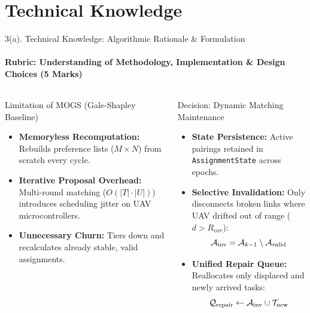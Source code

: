 \documentclass[aspectratio=169, 11pt]{beamer}
\begin{document}
\section{Technical Knowledge}
\begin{frame}{3(a). Technical Knowledge: Algorithmic Rationale \& Formulation}
    \framesubtitle{Rubric: Understanding of Methodology, Implementation \& Design Choices (5 Marks)}
    \begin{columns}[T]
        \begin{block}{Limitation of MOGS (Gale-Shapley Baseline)}
            \begin{itemize}\setlength{\itemsep}{4pt}\footnotesize
                \item \textbf{Memoryless Recomputation:} Rebuilds preference lists ($M \times N$) from scratch every cycle.
                \item \textbf{Iterative Proposal Overhead:} Multi-round matching ($O(|T| \cdot |U|)$) introduces scheduling jitter on UAV microcontrollers.
                \item \textbf{Unnecessary Churn:} Tiers down and recalculates already stable, valid assignments.
            \end{itemize}
        \end{block}

        \begin{block}{Decision: Dynamic Matching Maintenance}
            \begin{itemize}\setlength{\itemsep}{4pt}\footnotesize
                \item \textbf{State Persistence:} Active pairings retained in \texttt{AssignmentState} across epochs.
                \item \textbf{Selective Invalidation:} Only disconnects broken links where UAV drifted out of range ($d > R_{\text{cov}}$):
                \vspace{-2mm}
                \begin{equation*}
                    \small
                    \mathcal{A}_{\text{inv}} = \mathcal{A}_{k-1} \setminus \mathcal{A}_{\text{valid}}
                \end{equation*}
                \vspace{-3mm}
                \item \textbf{Unified Repair Queue:} Reallocates only displaced and newly arrived tasks:
                \vspace{-2mm}
                \begin{equation*}
                    \small
                    \mathcal{Q}_{\text{repair}} \leftarrow \mathcal{A}_{\text{inv}} \cup \mathcal{T}_{\text{new}}
                \end{equation*}
            \end{itemize}
        \end{block}
    \end{columns}
\end{frame}
\end{document}
